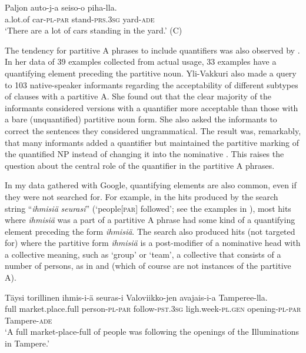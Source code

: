 \documentclass[output=paper]{LSP/langsci}
\begin{document}
\ea%
\label{15-hu-ex:33}

\gll Paljon auto-j-a seiso-o piha-lla.\\
a.lot.of car-\textsc{pl}-\textsc{par} stand-\textsc{prs}.\textsc{3sg} yard-\textsc{ade}\\
\glt ‘There are a lot of cars standing in the yard.’   (C)
\z

The tendency for partitive A phrases to include quantifiers was also observed by \citet{Yli-Vakkuri1979Partitiivisubjektin}. In her data of 39 examples collected from actual usage, 33 examples have a quantifying element preceding the partitive noun. Yli-Vakkuri also made a query to 103 native-speaker informants regarding the acceptability of different subtypes of clauses with a partitive A. She found out that the clear majority of the informants considered versions with a quantifier more acceptable than those with a bare (unquantified) partitive noun form. She also asked the informants to correct the sentences they considered ungrammatical. The result was, remarkably, that many informants added a quantifier but maintained the partitive marking of the quantified NP instead of changing it into the nominative \citep[175]{Yli-Vakkuri1979Partitiivisubjektin}. This raises the question about the central role of the quantifier in the partitive A phrases. 

In my data gathered with Google, quantifying elements are also common, even if they were not searched for. For example, in the hits produced by the search string “\textit{ihmisiä} \textit{seurasi}” (‘people[\textsc{par}] followed’; see the examples in ), most hits where \textit{ihmisiä} was a part of a partitive A phrase had some kind of a quantifying element preceding the form \textit{ihmisiä}. The search also produced hits (not targeted for) where the partitive form \textit{ihmisiä} is a post-modifier of a nominative head with a collective meaning, such as ‘group’ or ‘team’, \ie  a collective that consists of a number of persons, as in  and  (which of course are not instances of the partitive A).

\ea%
\label{15-hu-ex:34}
\gll Täysi torillinen ihmis-i-ä seuras-i Valoviikko-jen avajais-i-a Tamperee-lla.\\
full market.place.full person-\textsc{pl}-\textsc{par} follow-\textsc{pst}.\textsc{3sg} ligh.week-\textsc{pl}.\textsc{gen} opening-\textsc{pl}-\textsc{par} Tampere-\textsc{ade}\\
\glt ‘A full market-place-full of people was following the openings of the Illuminations in Tampere.’ %
\z
\end{document}
